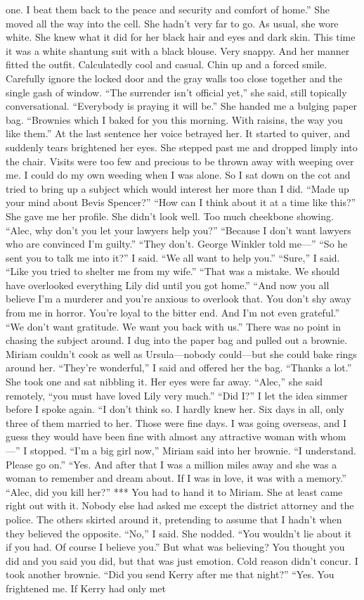 \documentclass{novel}
\begin{document}
one. I beat them back to the peace and security and comfort of home.” She moved all the way into the cell. She hadn’t very far to go. As usual, she wore white. She knew what it did for her black hair and eyes and dark skin. This time it was a white shantung suit with a black blouse. Very snappy. And her manner fitted the outfit. Calculatedly cool and casual. Chin up and a forced smile. Carefully ignore the locked door and the gray walls too close together and the single gash of window. “The surrender isn’t official yet,” she said, still topically conversational. “Everybody is praying it will be.” She handed me a bulging paper bag. “Brownies which I baked for you this morning. With raisins, the way you like them.” At the last sentence her voice betrayed her. It started to quiver, and suddenly tears brightened her eyes. She stepped past me and dropped limply into the chair. Visits were too few and precious to be thrown away with weeping over me. I could do my own weeding when I was alone. So I sat down on the cot and tried to bring up a subject which would interest her more than I did. “Made up your mind about Bevis Spencer?” “How can I think about it at a time like this?” She gave me her profile. She didn’t look well. Too much cheekbone showing. “Alec, why don’t you let your lawyers help you?” “Because I don’t want lawyers who are convinced I’m guilty.” “They don’t. George Winkler told me—” “So he sent you to talk me into it?” I said. “We all want to help you.” “Sure,” I said. “Like you tried to shelter me from my wife.” “That was a mistake. We should have overlooked everything Lily did until you got home.” “And now you all believe I’m a murderer and you’re anxious to overlook that. You don’t shy away from me in horror. You’re loyal to the bitter end. And I’m not even grateful.” “We don’t want gratitude. We want you back with us.” There was no point in chasing the subject around. I dug into the paper bag and pulled out a brownie. Miriam couldn’t cook as well as Ursula—nobody could—but she could bake rings around her. “They’re wonderful,” I said and offered her the bag. “Thanks a lot.” She took one and sat nibbling it. Her eyes were far away. “Alec,” she said remotely, “you must have loved Lily very much.” “Did I?” I let the idea simmer before I spoke again. “I don’t think so. I hardly knew her. Six days in all, only three of them married to her. Those were fine days. I was going overseas, and I guess they would have been fine with almost any attractive woman with whom—” I stopped. “I’m a big girl now,” Miriam said into her brownie. “I understand. Please go on.” “Yes. And after that I was a million miles away and she was a woman to remember and dream about. If I was in love, it was with a memory.” “Alec, did you kill her?” *** You had to hand it to Miriam. She at least came right out with it. Nobody else had asked me except the district attorney and the police. The others skirted around it, pretending to assume that I hadn’t when they believed the opposite. “No,” I said. She nodded. “You wouldn’t lie about it if you had. Of course I believe you.” But what was believing? You thought you did and you said you did, but that was just emotion. Cold reason didn’t concur. I took another brownie. “Did you send Kerry after me that night?” “Yes. You frightened me. If Kerry had only met 
\end{document}
